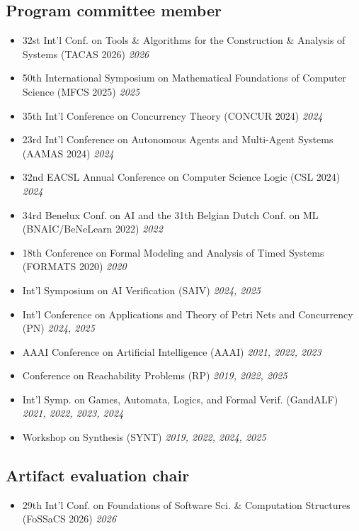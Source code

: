 \documentclass[10pt,a4paper]{moderncv}
\begin{document}
\subsection{Program committee member}
\begin{itemize}
  \item 32st Int'l Conf. on Tools \& Algorithms for the
    Construction \& Analysis of Systems (TACAS 2026) \hfill \textit{2026}
  \item 50th International Symposium on Mathematical Foundations of Computer
    Science (MFCS 2025) \hfill \textit{2025}
  \item 35th Int'l Conference on Concurrency Theory (CONCUR 2024) \hfill
    \textit{2024}
  \item 23rd Int'l Conference on Autonomous Agents and Multi-Agent
    Systems (AAMAS 2024) \hfill \textit{2024}
  \item 32nd EACSL Annual Conference on Computer Science Logic (CSL 2024)
    \hfill \textit{2024}
  \item 34rd Benelux Conf. on AI and the 31th
    Belgian Dutch Conf. on ML (BNAIC/BeNeLearn 2022) \hfill \textit{2022}
  \item 18th Conference on Formal Modeling and Analysis of Timed
    Systems (FORMATS 2020) \hfill \textit{2020}
  \item Int'l Symposium on AI Verification (SAIV) \hfill
    \textit{2024, 2025}
  \item Int'l Conference on Applications and Theory of Petri Nets
    and Concurrency (PN) \hfill \textit{2024, 2025}
  \item AAAI Conference on Artificial Intelligence (AAAI) \hfill
    \textit{2021, 2022, 2023}
  \item Conference on Reachability Problems (RP) \hfill \textit{2019, 2022,
    2025}
  \item Int'l Symp. on Games, Automata, Logics, and Formal
    Verif. (GandALF) \hfill \textit{2021, 2022, 2023, 2024}
  \item Workshop on Synthesis (SYNT) \hfill \textit{2019, 2022, 2024, 2025}
\end{itemize}

\subsection{Artifact evaluation chair}
\begin{itemize}
  \item 29th Int'l Conf. on Foundations of Software Sci. \&
    Computation Structures (FoSSaCS 2026) \hfill \textit{2026}
\end{itemize}
\end{document}
